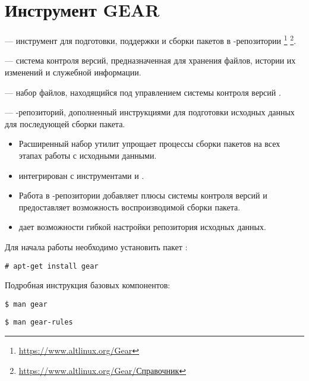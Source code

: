 \hypertarget{4}{\chapter{Инструмент GEAR}}\label{chapter-gear}
 ---
инструмент для подготовки, поддержки и сборки пакетов в -репозитории%
\footnote{\href{https://www.altlinux.org/Gear}{https://www.altlinux.org/Gear}}%
\footnote{\href{https://www.altlinux.org/Gear/\%D0\%A1\%D0\%BF\%D1\%80\%D0\%B0\%D0\%B2\%D0\%BE\%D1\%87\%D0\%BD\%D0\%B8\%D0\%BA}{https://www.altlinux.org/Gear/Справочник}}.


 --- система контроля версий, предназначенная для хранения файлов, истории
их изменений и служебной информации.

 --- набор файлов, находящийся под управлением системы
контроля версий .

 ---  -репозиторий, дополненный 
 инструкциями для подготовки исходных данных для последующей сборки пакета.

\begin{itemize}
	\item Расширенный набор утилит упрощает процессы сборки пакетов на всех этапах работы с исходными данными.
	\item {} интегрирован с инструментами  и .
	\item Работа в  -репозитории добавляет плюсы системы контроля версий и предоставляет возможность
	воспроизводимой сборки пакета.
	\item  {} дает возможности гибкой настройки репозитория исходных данных.
\end{itemize}

Для начала работы необходимо установить пакет :
\begin{verbatim}
# apt-get install gear
\end{verbatim}

Подробная инструкция базовых компонентов:
 \begin{verbatim}
$ man gear
\end{verbatim}

\begin{verbatim}
$ man gear-rules
\end{verbatim}

